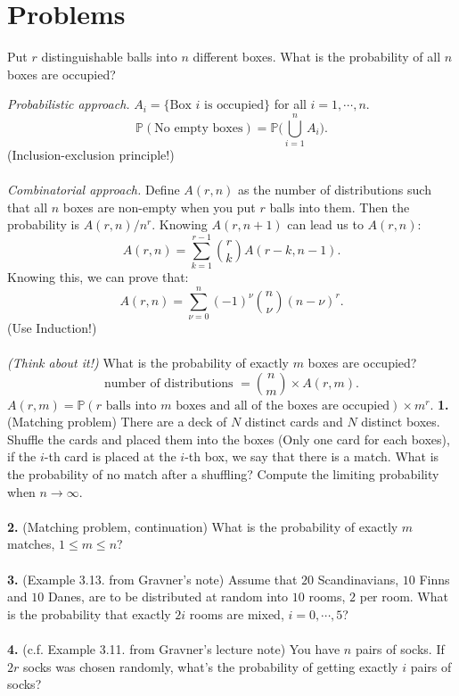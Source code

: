 \section{Problems}
\begin{exercise}
    Put $r$ distinguishable balls into $n$ different boxes. What is the probability of all $n$ boxes are occupied?
\end{exercise}
\textit{Probabilistic approach.} $A_i=\{\text{Box $i$ is occupied}\}$ for all $i=1,\cdots, n$.
\begin{equation}
\mathbb{P}(\text{No empty boxes}) = \mathbb{P}\Big(\bigcup_{i=1}^n A_i\Big).
\end{equation}
(Inclusion-exclusion principle!)\\ \\
\textit{Combinatorial approach.} Define $A(r,n)$ as the number of distributions such that all $n$ boxes are non-empty when you put $r$ balls into them. Then the probability is $A(r,n)/n^r$. Knowing $A(r,n+1)$ can lead us to $A(r,n)$:
\begin{equation}
A(r,n) = \sum_{k=1}^{r-1}\binom{r}{k}A(r-k,n-1).
\end{equation}
Knowing this, we can prove that:
\begin{equation}
A(r,n) = \sum_{\nu = 0}^n(-1)^\nu\binom{n}{\nu}(n-\nu)^r.
\end{equation}
(Use Induction!)\\ \\
\textit{(Think about it!)} What is the probability of exactly $m$ boxes are occupied?
\begin{equation}
\text{number of distributions }= \binom{n}{m}\times A(r,m).
\end{equation}
$A(r,m) = \mathbb{P}(\text{$r$ balls into $m$ boxes and all of the boxes are occupied})\times m^r$.
\newpage
\textbf{1.}(Matching problem) There are a deck of $N$ distinct cards and $N$ distinct boxes. Shuffle the cards and placed them into the boxes (Only one card for each boxes), if the $i$-th card is placed at the $i$-th box, we say that there is a match. What is the probability of no match after a shuffling? Compute the limiting probability when $n\rightarrow\infty$.\\ \\
\textbf{2. }(Matching problem, continuation) What is the probability of exactly $m$ matches, $1\leq m\leq n$?\\ \\
\textbf{3. }(Example 3.13. from Gravner's note) Assume that $20$ Scandinavians, $10$ Finns and $10$ Danes, are to be distributed at random into $10$ rooms, $2$ per room. What is the probability that exactly $2i$ rooms are mixed, $i = 0,\cdots,5$?\\ \\
\textbf{4. }(c.f. Example 3.11. from Gravner's lecture note) You have $n$ pairs of socks. If $2r$ socks was chosen randomly, what's the probability of getting exactly $i$ pairs of socks?\\ \\